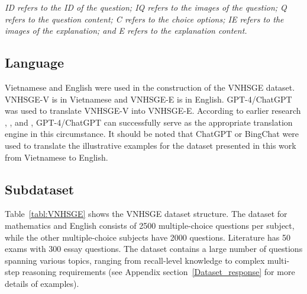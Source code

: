 \documentclass{article}
\begin{document}
{\begin{multicols}{2}
	\end{multicols}	
	
	\emph{ ID refers to the ID of the question; IQ refers to the images of the question; Q refers to the question content; C refers to the choice options; IE refers to the images of the explanation; and E refers to the explanation content.}	
	
	\subsection{Language}
	
	Vietnamese and English were used in the construction of the VNHSGE dataset. VNHSGE-V is in Vietnamese and VNHSGE-E is in English. GPT-4/ChatGPT was used to translate VNHSGE-V into VNHSGE-E. According to earlier research \cite{OpenAI_gpt_4_report},
	\cite{jiao2023chatgpt}, and
	\cite{bang2023multitask}, GPT-4/ChatGPT can successfully serve as the appropriate translation engine in this circumstance. It should be noted that ChatGPT or BingChat were used to translate the illustrative examples for the dataset presented in this work from Vietnamese to English.
	
	\subsection{Subdataset}
	
	Table~\ref{tabl:VNHSGE} shows the VNHSGE dataset structure. The dataset for mathematics and English consists of 2500 multiple-choice questions per subject, while the other multiple-choice subjects have 2000 questions. Literature has 50 exams with 300 essay questions. The dataset contains a large number of questions spanning various topics, ranging from recall-level knowledge to complex multi-step reasoning requirements (see Appendix section~\ref{Dataset_response} for more details of examples).    
	
}
\end{document}
